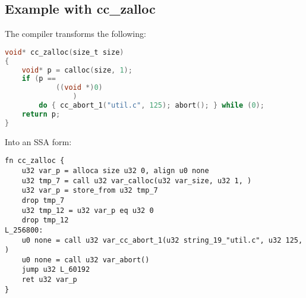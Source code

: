 \documentclass[12pt, letterpaper]{article}
\begin{document}
\subsection{Example with cc\_zalloc}
The compiler transforms the following:
\begin{lstlisting}[language=C]
void* cc_zalloc(size_t size)
{
    void* p = calloc(size, 1);
    if (p == 
            ((void *)0)
                )
        do { cc_abort_1("util.c", 125); abort(); } while (0);
    return p;
}
\end{lstlisting}
Into an SSA form:
\begin{lstlisting}[language=SSA]
fn cc_zalloc {
    u32 var_p = alloca size u32 0, align u0 none
    u32 tmp_7 = call u32 var_calloc(u32 var_size, u32 1, )
    u32 var_p = store_from u32 tmp_7
    drop tmp_7
    u32 tmp_12 = u32 var_p eq u32 0
    drop tmp_12
L_256800:
    u0 none = call u32 var_cc_abort_1(u32 string_19_"util.c", u32 125, )
    u0 none = call u32 var_abort()
    jump u32 L_60192
    ret u32 var_p
}
\end{lstlisting}
%
\end{document}
